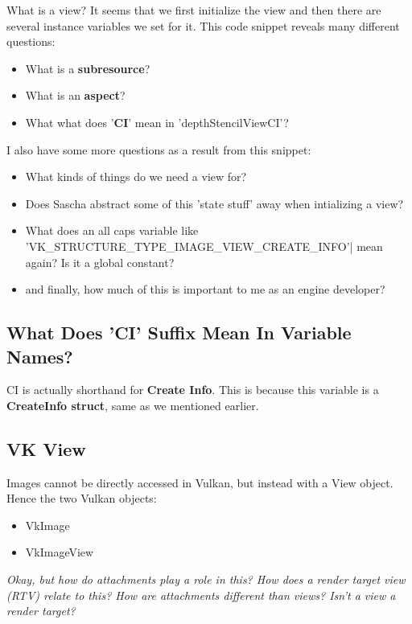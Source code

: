 \documentclass{article}
\begin{document}
\par What is a view? It seems that we first initialize the view and
then there are several instance variables we set for it. This code
snippet reveals many different questions:
\begin{itemize}
  \item What is a \textbf{subresource}?
  \item What is an \textbf{aspect}?
  \item What what does '\textbf{CI}' mean in 'depthStencilViewCI'?
\end{itemize}

\par I also have some more questions as a result from this snippet:
\begin{itemize}
  \item What kinds of things do we need a view for?
  \item Does Sascha abstract some of this 'state stuff' away when
    intializing a view?
  \item What does an all caps variable like
    'VK\_STRUCTURE\_TYPE\_IMAGE\_VIEW\_CREATE\_INFO'| mean again? Is it a
    global constant?
  \item \textemdash and finally, how much of this is important to me
    as an engine developer?
\end{itemize}

\subsection*{What Does 'CI' Suffix Mean In Variable Names?}
\par CI is actually shorthand for \textbf{Create Info}. This is
because this variable is a \textbf{CreateInfo struct}, same as we
mentioned earlier.

\subsection*{VK View}
\par Images cannot be directly accessed in Vulkan, but instead with a
View object. Hence the two Vulkan objects:
\begin{itemize}
  \item VkImage
  \item VkImageView
\end{itemize}
\par \textit{Okay, but how do attachments play a role in this? How
  does a render target view (RTV) relate to this? How are attachments
different than views? Isn't a view a render target?}
\end{document}
